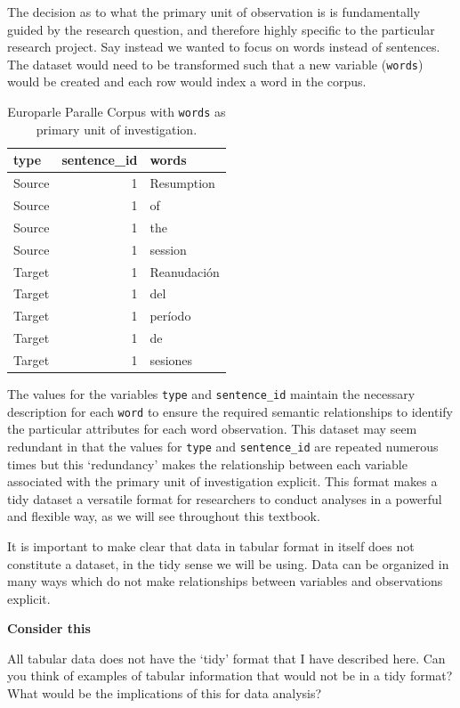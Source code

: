 \documentclass[
  letterpaper,
]{latex/krantz}
\begin{document}
The decision as to what the primary unit of observation is is
fundamentally guided by the research question, and therefore highly
specific to the particular research project. Say instead we wanted to
focus on words instead of sentences. The dataset would need to be
transformed such that a new variable (\texttt{words}) would be created
and each row would index a word in the corpus.

\hypertarget{tbl-tidy-words-europarle}{}
\begin{table}
\caption{\label{tbl-tidy-words-europarle}Europarle Paralle Corpus with \texttt{words} as primary unit of
investigation. }\tabularnewline

\centering
\begin{tabular}{lrl}
\toprule
type & sentence\_id & words\\
\midrule
Source & 1 & Resumption\\
Source & 1 & of\\
Source & 1 & the\\
Source & 1 & session\\
Target & 1 & Reanudación\\
\addlinespace
Target & 1 & del\\
Target & 1 & período\\
Target & 1 & de\\
Target & 1 & sesiones\\
\bottomrule
\end{tabular}
\end{table}

The values for the variables \texttt{type} and \texttt{sentence\_id}
maintain the necessary description for each \texttt{word} to ensure the
required semantic relationships to identify the particular attributes
for each word observation. This dataset may seem redundant in that the
values for \texttt{type} and \texttt{sentence\_id} are repeated numerous
times but this `redundancy' makes the relationship between each variable
associated with the primary unit of investigation explicit. This format
makes a tidy dataset a versatile format for researchers to conduct
analyses in a powerful and flexible way, as we will see throughout this
textbook.

It is important to make clear that data in tabular format in itself does
not constitute a dataset, in the tidy sense we will be using. Data can
be organized in many ways which do not make relationships between
variables and observations explicit.

\begin{tcolorbox}[enhanced jigsaw, left=2mm, arc=.35mm, colback=white, rightrule=.15mm, toprule=.15mm, breakable, leftrule=.75mm, opacityback=0, bottomrule=.15mm]

\textbf{ Consider this}

All tabular data does not have the `tidy' format that I have described
here. Can you think of examples of tabular information that would not be
in a tidy format? What would be the implications of this for data
analysis?

\end{tcolorbox}
\end{document}
